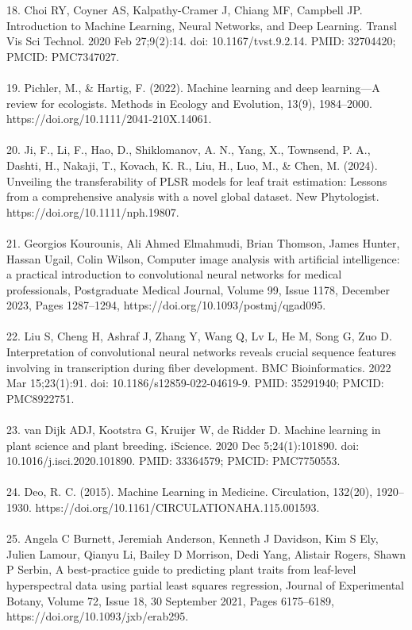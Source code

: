 \documentclass[12pt,a4paper]{report}
\begin{document}
18. Choi RY, Coyner AS, Kalpathy-Cramer J, Chiang MF, Campbell JP. Introduction to Machine Learning, Neural Networks, and Deep Learning. Transl Vis Sci Technol. 2020 Feb 27;9(2):14. doi: 10.1167/tvst.9.2.14. PMID: 32704420; PMCID: PMC7347027.\\
\\
19. Pichler, M., \& Hartig, F. (2022). Machine learning and deep learning—A review for ecologists. Methods in Ecology and Evolution, 13(9), 1984–2000. https://doi.org/10.1111/2041-210X.14061. \\
\\
20. Ji, F., Li, F., Hao, D., Shiklomanov, A. N., Yang, X., Townsend, P. A., Dashti, H., Nakaji, T., Kovach, K. R., Liu, H., Luo, M., \& Chen, M. (2024). Unveiling the transferability of PLSR models for leaf trait estimation: Lessons from a comprehensive analysis with a novel global dataset. New Phytologist. https://doi.org/10.1111/nph.19807. \\
\\
21. Georgios Kourounis, Ali Ahmed Elmahmudi, Brian Thomson, James Hunter, Hassan Ugail, Colin Wilson, Computer image analysis with artificial intelligence: a practical introduction to convolutional neural networks for medical professionals, Postgraduate Medical Journal, Volume 99, Issue 1178, December 2023, Pages 1287–1294, https://doi.org/10.1093/postmj/qgad095. \\
\\
22. Liu S, Cheng H, Ashraf J, Zhang Y, Wang Q, Lv L, He M, Song G, Zuo D. Interpretation of convolutional neural networks reveals crucial sequence features involving in transcription during fiber development. BMC Bioinformatics. 2022 Mar 15;23(1):91. doi: 10.1186/s12859-022-04619-9. PMID: 35291940; PMCID: PMC8922751. \\
\\
23. van Dijk ADJ, Kootstra G, Kruijer W, de Ridder D. Machine learning in plant science and plant breeding. iScience. 2020 Dec 5;24(1):101890. doi: 10.1016/j.isci.2020.101890. PMID: 33364579; PMCID: PMC7750553. \\
\\
24. Deo, R. C. (2015). Machine Learning in Medicine. Circulation, 132(20), 1920–1930. https://doi.org/10.1161/CIRCULATIONAHA.115.001593. \\
\\
25. Angela C Burnett, Jeremiah Anderson, Kenneth J Davidson, Kim S Ely, Julien Lamour, Qianyu Li, Bailey D Morrison, Dedi Yang, Alistair Rogers, Shawn P Serbin, A best-practice guide to predicting plant traits from leaf-level hyperspectral data using partial least squares regression, Journal of Experimental Botany, Volume 72, Issue 18, 30 September 2021, Pages 6175–6189, https://doi.org/10.1093/jxb/erab295. \\
\end{document}
